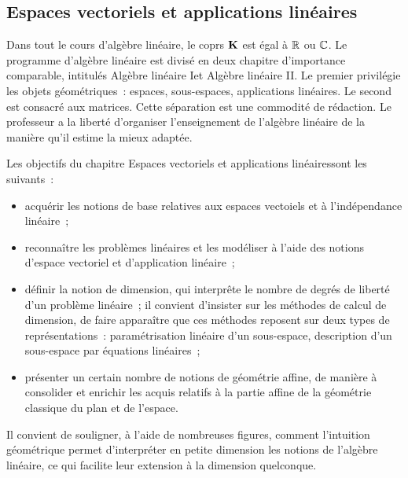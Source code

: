 \subsection{Espaces vectoriels et applications linéaires}
\begin{itshape}Dans tout le cours d'algèbre linéaire, le coprs $\mathbf{K}$ est égal à $\mathbb{R}$ ou $\mathbb{C}$. 
Le programme d'algèbre linéaire est divisé en deux chapitre d'importance comparable, intitulés \og Algèbre linéaire I\fg et \og Algèbre linéaire II\fg. Le premier privilégie les objets géométriques~: espaces, sous-espaces, applications linéaires. Le second est consacré aux matrices. Cette séparation est une commodité de rédaction. Le professeur a la liberté d'organiser l'enseignement de l'algèbre linéaire de la manière qu'il estime la mieux adaptée.

Les objectifs du chapitre \og Espaces vectoriels et applications linéaires\fg sont les suivants~:
\begin{itemize}
\item acquérir les notions de base relatives aux espaces vectoiels et à l'indépendance linéaire~;
\item reconnaître les problèmes linéaires et les modéliser à l'aide des notions d'espace vectoriel et d'application linéaire~;
\item définir la notion de dimension, qui interprête le nombre de degrés de liberté d'un problème linéaire~; il convient d'insister sur les méthodes de calcul de dimension, de faire apparaître que ces méthodes reposent sur deux types de représentations~: paramétrisation linéaire d'un sous-espace, description d'un sous-espace par équations linéaires~;
\item présenter un certain nombre de notions de géométrie affine, de manière à consolider et enrichir les acquis relatifs à la partie affine de la géométrie classique du plan et de l'espace.
\end{itemize}
Il convient de souligner, à l'aide de nombreuses figures, comment l'intuition géométrique permet d'interpréter en petite dimension les notions de l'algèbre linéaire, ce qui facilite leur extension à la dimension quelconque.\end{itshape}

\setcounter{subsubsection}{0}





